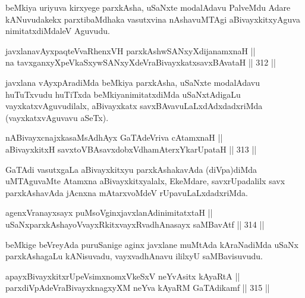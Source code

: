 \begin{artha}
beMkiya uriyuva kirxyege parxkAsha, uSaNxte modalAdavu PalveMdu Adare
kANuvudakekx parxtibaMdhaka vasutxvina nAshavuMTAgi aBivayxkitxyAguva
nimitatxdiMdaleV Aguvudu.
\end{artha}

\begin{shl}
javxlanavAyxpaqteVvaRhenxVH parxkAshwSANxyXdijanamxnaH || \\
na tavxganxyXpeVkaSxywSANxyXdeVraBivayxkatxsavxBAvataH \hfill || 312 ||  
\end{shl}

\begin{artha}
javxlana vAyxpAradiMda beMkiya parxkAsha, uSaNxte modalAdavu
huTuTxvudu huTiTxda beMkiyanimitatxdiMda uSaNxtAdigaLu
vayxkatxvAguvudilalx, aBivayxkatx savxBAvavuLaLxdAdxdadxriMda
(vayxkatxvAguvavu aSeTx).
\end{artha}

\begin{shl}
nABivayxcnajxkasaMsAdhAyx GaTAdeVriva cA\s \s tamxnaH || \\
aBivayxkitxH savxtoVBAsavxdobxVdhamAterxYkarUpataH \hfill || 313 ||  
\end{shl}

\begin{artha}
GaTAdi vasutxgaLa aBivayxkitxyu parxkAshakavAda (diVpa)diMda
uMTAguvaMte Atamxna aBivayxkitxyalalx, EkeMdare, savxrUpadalilx savx
parxkAshavAda jAcnxna mAtarxvoMdeV rUpavuLaLxdadxriMda.
\end{artha}


\begin{shl}
agenxVranayxsayx puMsoV\s ginxjavxlanAdinimitatxtaH ||  \\
uSaNxparxkAshayoVvayxRkitxvayxRvadhAnasayx saMBavAtf \hfill || 314 ||  
\end{shl}

\begin{artha}
beMkige beVreyAda puruSanige aginx javxlane muMtAda kAraNadiMda uSaNx
parxkAshagaLu kANisuvadu, vayxvadhAnavu ililxyU saMBavisuvudu.
\end{artha}

\begin{shl}
apayxBivayxkitxrUpeV\s simxnomxVkeSxV neYvAsitx kAyaRtA || \\
parxdiVpAdeVraBivayxknagxyXM neYva kAyaRM GaTAdikamf \hfill || 315 ||  
\end{shl}

